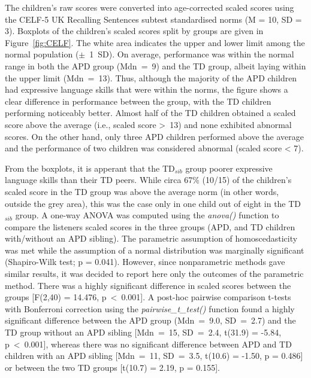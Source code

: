 \documentclass[a4paper, twoside]{templates/ociamthesis}
\begin{document}
The children's raw scores were converted into age-corrected scaled scores using the CELF-5 UK Recalling Sentences subtest standardised norms (M = 10, SD = 3). Boxplots of the children's scaled scores split by groups are given in Figure~\ref{fig:CELF}. The white area indicates the upper and lower limit among the normal population (\(\pm\)~1~SD). On average, performance was within the normal range in both the APD group (Mdn~=~9) and the TD group, albeit laying within the upper limit (Mdn~=~13). Thus, although the majority of the APD children had expressive language skills that were within the norms, the figure shows a clear difference in performance between the group, with the TD children performing noticeably better. Almost half of the TD children obtained a scaled score above the average (i.e., scaled score \textgreater~13) and none exhibited abnormal scores. On the other hand, only three APD children performed above the average and the performance of two children was considered abnormal (scaled score \textless{} 7).

From the boxplots, it is apperant that the TD\(_{sib}\) group poorer expressive language skills than their TD peers. While circa 67\% (10/15) of the children's scaled score in the TD group was above the average norm (in other words, outside the grey area), this was the case only in one child out of eight in the TD\(_{sib}\) group. A one-way ANOVA was computed using the \emph{anova()} function to compare the listeners scaled scores in the three groups (APD, and TD children with/without an APD sibling). The parametric assumption of homoscedasticity was met while the assumption of a normal distribution was marginally significant (Shapiro-Wilk test; p = 0.041). However, since nonparametric methods gave similar results, it was decided to report here only the outcomes of the parametric method. There was a highly significant difference in scaled scores between the groups {[}F(2,40) = 14.476, p~\textless~0.001{]}. A post-hoc pairwise comparison t-tests with Bonferroni correction using the \emph{pairwise\_t\_test()} function \autocite[rstatix package;][]{rstatixPackageR} found a highly significant difference between the APD group (Mdn~=~9.0, SD~=~2.7) and the TD group without an APD sibling {[}Mdn~=~15, SD~=~2.4, t(31.9) = -5.84, p~\textless~0.001{]}, whereas there was no significant difference between APD and TD children with an APD sibling {[}Mdn~=~11, SD~=~3.5, t(10.6) = -1.50, p = 0.486{]} or between the two TD groups {[}t(10.7) = 2.19, p = 0.155{]}.\\
\end{document}
